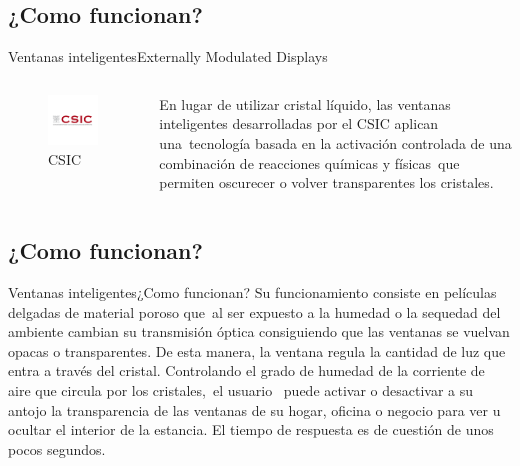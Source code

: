 \documentclass[10pt]{beamer}
\begin{document}
\subsection{¿Como funcionan?}
\begin{frame}{Ventanas inteligentes}{Externally Modulated Displays}


  \begin{columns}

  	  \begin{figure}
  	  	\includegraphics[scale=0.5]{Imagenes/2}
  	  	\caption{CSIC}
  	  \end{figure}
      	\justify
    En lugar de utilizar cristal líquido, las ventanas inteligentes desarrolladas por el CSIC aplican una tecnología basada en la activación controlada de una combinación de reacciones químicas y físicas que permiten oscurecer o volver transparentes los cristales.
  \end{columns} 

\end{frame}

\subsection{¿Como funcionan?}
\begin{frame}{Ventanas inteligentes}{¿Como funcionan?}
    \justify	
    Su funcionamiento consiste en películas delgadas de material poroso que al ser expuesto a la humedad o la sequedad del ambiente cambian su transmisión óptica consiguiendo que las ventanas se vuelvan opacas o transparentes. De esta manera, la ventana regula la cantidad de luz que entra a través del cristal.
    Controlando el grado de humedad de la corriente de aire que circula por los cristales, el usuario  puede activar o desactivar a su antojo la transparencia de las ventanas de su hogar, oficina o negocio para ver u ocultar el interior de la estancia. El tiempo de respuesta es de cuestión de unos pocos segundos.

\end{frame}
\end{document}
